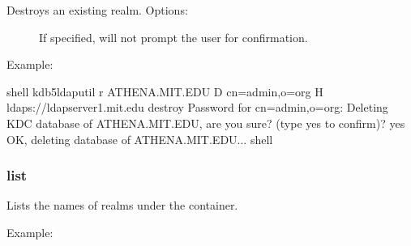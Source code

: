 \documentclass[letterpaper,10pt,english]{sphinxmanual}
\begin{document}
\sphinxAtStartPar
Destroys an existing realm. Options:
\begin{description}
\item[{}] \leavevmode
\sphinxAtStartPar
If specified, will not prompt the user for confirmation.

\end{description}

\sphinxAtStartPar
Example:

\begin{sphinxVerbatim}[commandchars=\\\{\}]
shell\PYGZpc{} kdb5\PYGZus{}ldap\PYGZus{}util \PYGZhy{}r ATHENA.MIT.EDU \PYGZhy{}D cn=admin,o=org \PYGZhy{}H
    ldaps://ldap\PYGZhy{}server1.mit.edu destroy
Password for \PYGZdq{}cn=admin,o=org\PYGZdq{}:
Deleting KDC database of \PYGZsq{}ATHENA.MIT.EDU\PYGZsq{}, are you sure?
(type \PYGZsq{}yes\PYGZsq{} to confirm)? yes
OK, deleting database of \PYGZsq{}ATHENA.MIT.EDU\PYGZsq{}...
shell\PYGZpc{}
\end{sphinxVerbatim}


\subsubsection{list}
\label{\detokenize{admin/admin_commands/kdb5_ldap_util:list}}\label{\detokenize{admin/admin_commands/kdb5_ldap_util:kdb5-ldap-util-destroy-end}}\label{\detokenize{admin/admin_commands/kdb5_ldap_util:kdb5-ldap-util-list}}\begin{quote}

\sphinxAtStartPar
{}
\end{quote}

\sphinxAtStartPar
Lists the names of realms under the container.

\sphinxAtStartPar
Example:

\begin{sphinxVerbatim}[commandchars=\\\{\}]
    
     
  
\end{sphinxVerbatim}
\end{document}
